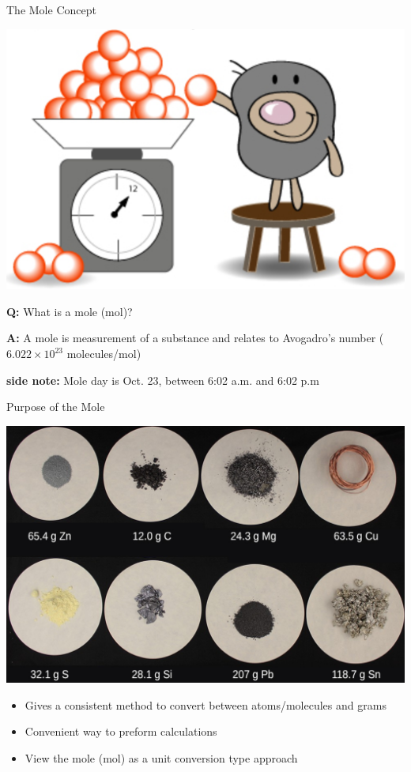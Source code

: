 \documentclass[11pt]{beamer}
\begin{document}
\begin{frame}{The Mole Concept}
  \begin{center}
    \includegraphics[scale=0.2]{mole}
  \end{center}
  
  \textbf{Q:} What is a mole (mol)?

  \textbf{A:} A mole is measurement of a substance and relates to
  Avogadro's number ($6.022 \times 10^{23}$ molecules/mol)

  \textbf{side note:} Mole day is Oct. 23, between 6:02 a.m. and 6:02 p.m
\end{frame}

\begin{frame}{Purpose of the Mole}
  \begin{center}
    \includegraphics[scale=0.1]{mol_solids}
  \end{center}
  
  \begin{itemize}
  \item Gives a consistent method to convert between atoms/molecules and grams
  \item Convenient way to preform calculations
  \item View the mole (mol) as a unit conversion type approach
  \end{itemize}
\end{frame}
\end{document}

